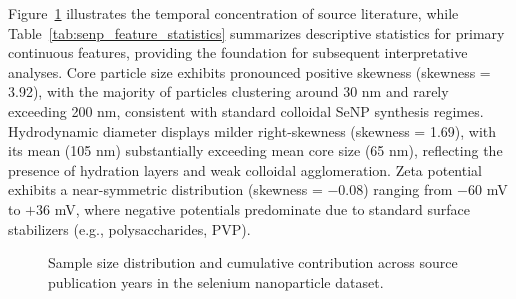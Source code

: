 \documentclass[letterpaper]{article}
\begin{document}
Figure~\ref{fig:senp-year-distribution} illustrates the temporal concentration of source literature, while Table~\ref{tab:senp_feature_statistics} summarizes descriptive statistics for primary continuous features, providing the foundation for subsequent interpretative analyses. Core particle size exhibits pronounced positive skewness (skewness = 3.92), with the majority of particles clustering around 30 nm and rarely exceeding 200 nm, consistent with standard colloidal SeNP synthesis regimes. Hydrodynamic diameter displays milder right-skewness (skewness = 1.69), with its mean (105 nm) substantially exceeding mean core size (65 nm), reflecting the presence of hydration layers and weak colloidal agglomeration. Zeta potential exhibits a near-symmetric distribution (skewness = $-0.08$) ranging from $-60$ mV to $+36$ mV, where negative potentials predominate due to standard surface stabilizers (e.g., polysaccharides, PVP).

\begin{figure}[H]
  \centering
  \begin{minipage}{0.48\linewidth}
    \centering
  \end{minipage}
  \hfill
  \begin{minipage}{0.48\linewidth}
    \centering
  \end{minipage}
  \caption{Sample size distribution and cumulative contribution across source publication years in the selenium nanoparticle dataset.}
  \label{fig:senp-year-distribution}
\end{figure}
\end{document}
